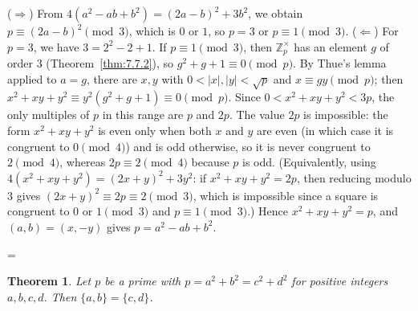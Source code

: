 \documentclass[11pt]{article}
\makeatletter
\theoremstyle{ntstyle}
\newtheorem{theorem}{Theorem}[subsection]
\let\nt@closedisplay\]
\def\nt@guardedclose{\@ifnextchar\par{\nt@closeafterpar}{\@ifnextchar\end{\postdisplaypenalty\@M\nt@closedisplay}{\nt@closedisplay}}}
\def\nt@closeafterpar\par{\@ifnextchar\par{\nt@closeafterpar}{\@ifnextchar\end{\postdisplaypenalty\@M\nt@closedisplay\par}{\nt@closedisplay\par}}}
\renewenvironment{proof}[1][\proofname]{\par
  \pushQED{\qed}\normalfont\topsep\medskipamount\edef\nt@afterproof{\@endparpenalty=\the\@endparpenalty\relax}\@beginparpenalty\@M\@endparpenalty\@M\let\]\nt@guardedclose\trivlist\item[]\textit{#1\@addpunct{.}} \ignorespaces}{\ifvmode\addpenalty\@M\fi\popQED\nt@afterproof\endtrivlist\@endpefalse}
\newcommand{\ZmodUnits}[1]{\mathbb{Z}_{#1}^{\times}}
\makeatother
\begin{document}
\begin{proof} ($\Rightarrow$) From $4(a^2 - ab + b^2) =
		(2a - b)^2 + 3b^2$, we obtain $p \equiv (2a - b)^2 \pmod{3}$, which is $0$ or
	$1$, so $p = 3$ or $p \equiv 1 \pmod{3}$. ($\Leftarrow$) For $p = 3$,
	we have $3 = 2^2 - 2 + 1$. If $p \equiv 1 \pmod{3}$, then
	$\ZmodUnits{p}$ has an element $g$ of order $3$ (Theorem~\ref{thm:7.7.2}), so $g^2 + g + 1 \equiv 0 \pmod{p}$. By Thue's lemma applied to
	$a = g$, there are $x, y$ with $0 < |x|, |y| < \sqrt{p}$ and $x \equiv
		gy \pmod{p}$; then $x^2 + xy + y^2 \equiv y^2(g^2 + g + 1) \equiv 0
		\pmod{p}$. Since $0 < x^2 + xy + y^2 < 3p$, the only multiples of $p$
	in this range are $p$ and $2p$. The value $2p$ is impossible: the
	form $x^2 + xy + y^2$ is even only when both $x$ and $y$ are even (in
	which case it is congruent to $0 \pmod{4}$) and is odd otherwise, so it is
	never congruent to $2 \pmod{4}$, whereas $2p \equiv 2 \pmod{4}$ because $p$
	is odd. (Equivalently, using $4(x^2 + xy + y^2) = (2x + y)^2 + 3y^2$:
	if $x^2 + xy + y^2 = 2p$, then reducing modulo $3$ gives $(2x + y)^2
		\equiv 2p \equiv 2 \pmod{3}$, which is impossible since a square is congruent to $0$
	or $1 \pmod{3}$ and $p \equiv 1 \pmod{3}$.) Hence $x^2 + xy + y^2 = p$,
	and $(a, b) = (x, -y)$ gives $p = a^2 - ab + b^2$.

\end{proof}
\begin{theorem}\label{thm:8.1.7} Let $p$ be a prime with $p = a^2 + b^2 = c^2 + d^2$
	for positive integers $a, b, c, d$. Then $\{a, b\} = \{c, d\}$.

\end{theorem}
\end{document}
